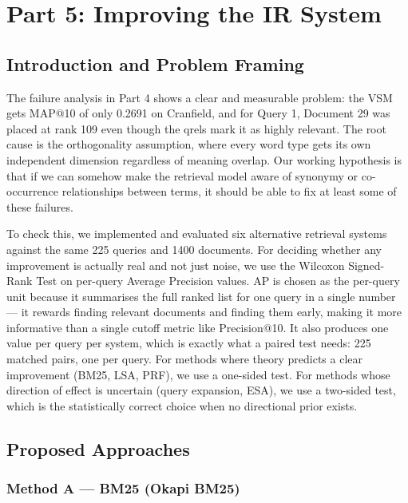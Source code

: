 \documentclass{article}
\begin{document}
\section{Part 5: Improving the IR System}

\subsection{Introduction and Problem Framing}

The failure analysis in Part 4 shows a clear and measurable problem: the VSM gets MAP@10 of only 0.2691 on Cranfield, and for Query 1, Document 29 was placed at rank 109 even though the qrels mark it as highly relevant. The root cause is the orthogonality assumption, where every word type gets its own independent dimension regardless of meaning overlap. Our working hypothesis is that if we can somehow make the retrieval model aware of synonymy or co-occurrence relationships between terms, it should be able to fix at least some of these failures.

To check this, we implemented and evaluated six alternative retrieval systems against the same 225 queries and 1400 documents. For deciding whether any improvement is actually real and not just noise, we use the Wilcoxon Signed-Rank Test on per-query Average Precision values. AP is chosen as the per-query unit because it summarises the full ranked list for one query in a single number --- it rewards finding relevant documents and finding them early, making it more informative than a single cutoff metric like Precision@10. It also produces one value per query per system, which is exactly what a paired test needs: 225 matched pairs, one per query. For methods where theory predicts a clear improvement (BM25, LSA, PRF), we use a one-sided test. For methods whose direction of effect is uncertain (query expansion, ESA), we use a two-sided test, which is the statistically correct choice when no directional prior exists.

\subsection{Proposed Approaches}

\subsubsection{Method A --- BM25 (Okapi BM25)}
\end{document}

